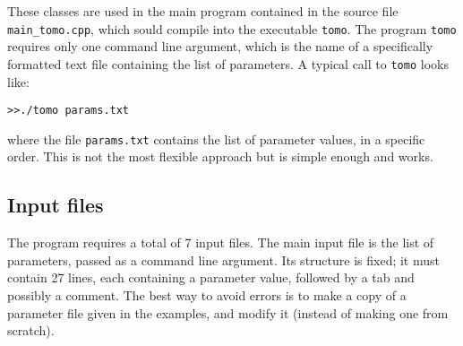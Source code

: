 \documentclass{article}
\begin{document}
These classes are used in the main program contained in the source file \verb+main_tomo.cpp+, which sould compile into the executable \verb+tomo+. The program \verb+tomo+ requires only one command line argument, which is the name of a specifically formatted text file containing the list of parameters. A typical call to \verb+tomo+ looks like:
\begin{verbatim}
>>./tomo params.txt
\end{verbatim}
where the file \verb+params.txt+ contains the list of parameter values, in a specific order. This is not the most flexible approach but is simple enough and works.

\subsection{Input files}

The program requires a total of 7 input files. The main input file is the list of parameters, passed as a command line argument. Its structure is fixed; it must contain 27 lines, each containing a parameter value, followed by a tab and possibly a comment. The best way to avoid errors is to make a copy of a parameter file given in the examples, and modify it (instead of making one from scratch).
\end{document}
